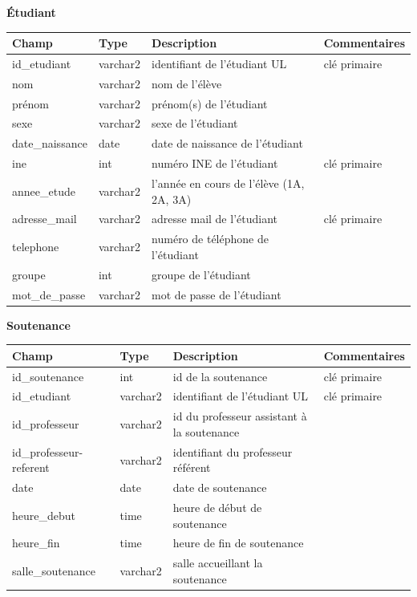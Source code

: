 \documentclass{scrreprt}
\begin{document}
\vspace {6cm}
\begin{center}
\textbf 
{Étudiant}
\vspace {0,5cm}

\begin{tabular}{|p{}|p{2cm}|p{7cm}|p{}|}
  \hline
  \textbf {Champ} & \textbf {Type} & \textbf {Description} & \textbf {Commentaires} \\
  \hline
  id_etudiant & varchar2 & identifiant de l'étudiant UL & clé primaire\\
  \hline
  nom & varchar2 & nom de l'élève &  \\
  \hline
  prénom & varchar2 & prénom(s) de l'étudiant &  \\
  \hline
  sexe & varchar2 & sexe de l'étudiant &  \\
  \hline
  date_naissance & date & date de naissance de l'étudiant &  \\
  \hline
  ine & int & numéro INE de l'étudiant & clé primaire \\
  \hline
  annee_etude & varchar2 & l'année en cours de l'élève (1A, 2A, 3A) &  \\
  \hline
  adresse_mail & varchar2 & adresse mail de l'étudiant & clé primaire\\
  \hline
  telephone & varchar2 & numéro de téléphone de l'étudiant &  \\
  \hline
  groupe & int & groupe de l'étudiant &  \\
  \hline
  mot_de_passe & varchar2 & mot de passe de l'étudiant &  \\
  \hline
\end{tabular}

\vspace {1cm}
\textbf 
{Soutenance}
\vspace {0,5cm}

\begin{tabular}{|p{}|p{2cm}|p{7cm}|p{}|}
  \hline
  \textbf {Champ} & \textbf {Type} & \textbf {Description} & \textbf {Commentaires} \\
  \hline
  id_soutenance & int & id de la soutenance & clé primaire\\
  \hline
  id_etudiant & varchar2 & identifiant de l'étudiant UL & clé primaire\\
  \hline
  id_professeur & varchar2 & id du professeur assistant à la soutenance &  \\
  \hline
  id_professeur-referent & varchar2 & identifiant du professeur référent &  \\
  \hline
  date & date & date de soutenance &  \\
  \hline
  heure_debut & time & heure de début de soutenance &  \\
  \hline
  heure_fin & time & heure de fin de soutenance &  \\
  \hline
  salle_soutenance & varchar2 & salle accueillant la soutenance &  \\
  \hline
\end{tabular}


\end{center}
\end{document}
